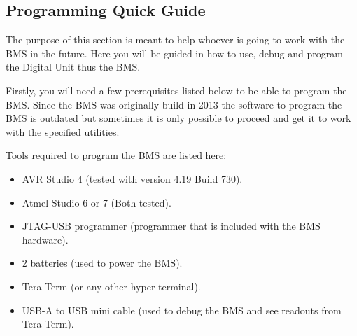 \subsection{Programming Quick Guide}
\label{sec:BMSDebugging}
The purpose of this section is meant to help whoever is going to work with the BMS in the future. Here you will be guided in how to use, debug and program the Digital Unit thus the BMS.

Firstly, you will need a few prerequisites listed below to be able to program the BMS. Since the BMS was originally build in 2013 the software to program the BMS is outdated but sometimes it is only possible to proceed and get it to work with the specified utilities. 

Tools required to program the BMS are listed here:
	\begin{itemize}
		\item AVR Studio 4 (tested with version 4.19 Build 730).
		\item Atmel Studio 6 or 7 (Both tested).
		\item JTAG-USB programmer (programmer that is included with the BMS hardware).
		\item 2 batteries (used to power the BMS).
		\item Tera Term (or any other hyper terminal).
		\item USB-A to USB mini cable (used to debug the BMS and see readouts from Tera Term).
	\end{itemize}
	
